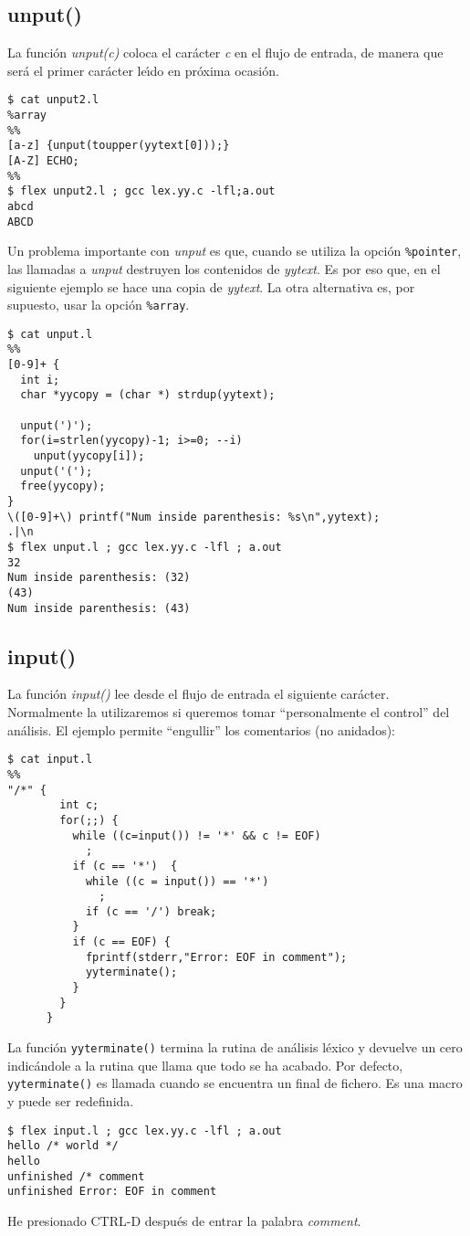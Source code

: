 \subsection{unput()}
La funci\'on \emph{unput(c)} coloca el car\'acter \emph{c} en el flujo
de entrada, de manera que ser\'a el primer car\'acter le\'{\i}do en pr\'oxima
ocasi\'on.
\begin{verbatim}
$ cat unput2.l
%array
%%
[a-z] {unput(toupper(yytext[0]));}
[A-Z] ECHO;
%%
$ flex unput2.l ; gcc lex.yy.c -lfl;a.out
abcd
ABCD                             
\end{verbatim}
Un problema importante con \emph{unput} es que, cuando se utiliza la
opci\'on \verb|%pointer|, las llamadas a \emph{unput} destruyen los
contenidos de \emph{yytext}. Es por eso que, en el siguiente ejemplo se
hace una copia de \emph{yytext}. La otra alternativa es, por supuesto,
usar la opci\'on \verb|%array|.
\begin{verbatim}
$ cat unput.l
%%
[0-9]+ {
  int i;
  char *yycopy = (char *) strdup(yytext);
 
  unput(')');
  for(i=strlen(yycopy)-1; i>=0; --i)
    unput(yycopy[i]);
  unput('(');
  free(yycopy);
}
\([0-9]+\) printf("Num inside parenthesis: %s\n",yytext);
.|\n
$ flex unput.l ; gcc lex.yy.c -lfl ; a.out
32
Num inside parenthesis: (32)
(43)
Num inside parenthesis: (43)            
\end{verbatim}

\subsection{input()}
\label{section:input}
La funci\'on \emph{input()} lee desde el flujo de entrada 
el siguiente car\'acter. Normalmente la utilizaremos si queremos 
tomar ``personalmente el control''  del an\'alisis. El ejemplo 
permite ``engullir'' los comentarios (no anidados):
\begin{verbatim}
$ cat input.l
%%
"/*" {
        int c;
        for(;;) {
          while ((c=input()) != '*' && c != EOF)
            ;
          if (c == '*')  {
            while ((c = input()) == '*')
              ;
            if (c == '/') break;
          }
          if (c == EOF) {
            fprintf(stderr,"Error: EOF in comment");
            yyterminate();
          }
        }
      }                                              
\end{verbatim}
La funci\'on \verb|yyterminate()| termina la rutina de an\'alisis l\'exico y devuelve un cero indicándole a la rutina que llama que todo se ha acabado. 
Por defecto, \verb|yyterminate()| es llamada cuando se encuentra 
un final de fichero. Es una macro y puede ser redefinida.
\begin{verbatim}
$ flex input.l ; gcc lex.yy.c -lfl ; a.out
hello /* world */
hello
unfinished /* comment
unfinished Error: EOF in comment
\end{verbatim}
He presionado CTRL-D despu\'es de entrar la palabra \emph{comment}.

